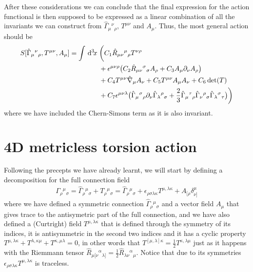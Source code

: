\documentclass[%
  showpacs,showkeys,prd,superscriptaddress]{revtex4-1}
\begin{document}
After these considerations we can conclude that the final expression for the action functional is then supposed to be expressed as a linear combination of all the invariants we can construct from $\hat\Gamma_{\mu}{}^{\nu}{}_\rho$, $T^{\mu\nu}$ and $A_\mu$. Thus, the most general action should be 
\begin{equation}
  \begin{split}
    S[\hat\Gamma_{\mu}{}^{\nu}{}_\rho,T^{\mu\nu},A_\mu] = \int \dn{3}{x} & \bigg(
    C_1\hat R_{\mu\nu}{}^{\mu}{}_\rho T^{\nu\rho}\\
    & + \epsilon^{\mu\nu\rho}\big(C_2\hat R_{\mu\nu}{}^{\sigma}{}_\sigma A_\rho
    + C_3A_\mu\partial_\nu A_\rho\big)\\%
    & + C_4T^{\mu\nu}\hat\nabla_\mu A_\nu
    + C_5T^{\mu\nu}A_\mu A_\nu
    + C_6\det(T)\\%
    & + C_7\epsilon^{\mu\nu\lambda}\big(\hat\Gamma_{\mu}{}^{\sigma}{}_\rho\partial_\nu\hat\Gamma_{\lambda}{}^{\rho}{}_\sigma+\frac{2}{3}\hat\Gamma_{\mu}{}^{\tau}{}_\rho\hat\Gamma_{\nu}{}^{\rho}{}_\sigma\hat\Gamma_{\lambda}{}^{\sigma}{}_\tau\big)
    \bigg)
  \end{split}
\end{equation}
where we have included the Chern-Simons term as it is also invariant.

\section{4D metricless torsion action}
Following the precepts we have already learnt, we will start by defining a decomposition for the full connection field 
\begin{align}
  \Gamma_{\rho}{}^{\mu}{}_\sigma=\hat\Gamma_{\rho}{}^{\mu}{}_\sigma+T_{\rho}{}^{\mu}{}_\sigma=\hat\Gamma_{\rho}{}^{\mu}{}_\sigma+\epsilon_{\rho\sigma\lambda\kappa}T^{\mu,\lambda\kappa}+A_{[\rho}\delta^\mu_{\nu]}
\end{align}
where we have defined a symmetric connection $\hat\Gamma_{\rho}{}^{\mu}{}_\sigma$ and a vector field $A_\mu$ that gives trace to the antisymetric part of the full connection, and we have also defined a (Curtright) field $T^{\mu,\lambda\kappa}$ that is defined through the symmetry of its indices, it is antisymmetric in the second two indices and it has a cyclic property $T^{\mu,\lambda\kappa}+T^{\lambda,\kappa\mu}+T^{\kappa,\mu\lambda}=0$, in other words that $T^{[\mu,\lambda]\kappa}=\frac{1}{2}T^{\kappa,\lambda\mu}$ just as it happens with the Riemmann tensor $\hat R_{\mu[\nu}{}^\alpha{}_{\lambda]}=\frac{1}{2}\hat R_{\lambda\nu}{}^\alpha{}_{\mu}$. Notice that due to its symmetries $\epsilon_{\rho\sigma\lambda\kappa}T^{\mu,\lambda\kappa}$ is traceless. 
\end{document}
